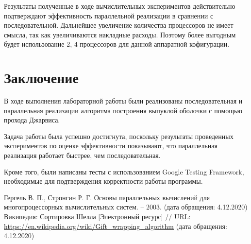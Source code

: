 \documentclass{report}
\begin{document}
\par Результаты полученные в ходе вычислительных экспериментов действительно подтверждают эффективность параллельной реализации в сравнении с последовательной. Дальнейшее увеличение количества процессоров не имеет смысла, так как увеличиваются накладные расходы. Поэтому более выгодным будет использование 2, 4 процессоров для данной аппаратной кофигурации.
\newpage

\section*{Заключение}
В ходе выполнения лабораторной работы были реализованы последовательная и параллельная реализации алгоритма построения выпуклой оболочки с помощью прохода Джарвиса.
\par Задача работы была успешно достигнута, поскольку результаты проведенных экспериментов по оценке эффективности показывают, что параллельная реализация работает быстрее, чем последовательная.
\par Кроме того, были написаны тесты с использованием Google Testing Framework, необходимые для подтверждения корректности работы программы.
\newpage

\begin{thebibliography}{1}
 Гергель В. П., Стронгин Р. Г. Основы параллельных вычислений для многопроцессорных вычислительных систем. – 2003. (дата обращения: 4.12.2020)
 Википедия: Сортировка Шелла [Электронный ресурс] // URL: \url {https://en.wikipedia.org/wiki/Gift_wrapping_algorithm} (дата обращения: 4.12.2020)
\end{thebibliography}
\newpage

\end{document}
